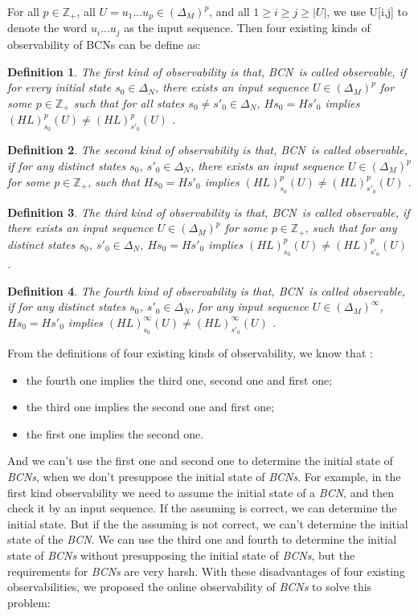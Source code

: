 \documentclass[conference]{IEEEtran} %
\newtheorem{definition}{Definition}
\def \BCN {{\em BCN}}
\begin{document}
For all  $p\in \mathbb{Z}_+$, all $U=u_1 ... u_p \in(\Delta_M)^p$, and all $1\ge i \ge j \ge |U|$, we use U[i,j] to denote the word $u_i ... u_j$ as the input sequence. Then four existing kinds of observability of BCNs can be define as: 
\begin{definition}
The first kind of observability is that, \BCN\ is called observable, if for every initial state $s_0 \in \Delta_N$, there exists an input sequence $U\in(\Delta_M)^p$ for some $p\in \mathbb{Z}_+$ such that for all states $s_0\neq {s'}_0\in \Delta_N$, $Hs_0=H{s'}_0$ implies $(HL)^p_{s_0}(U)\neq (HL)^p_{{s'}_0}(U)$ \cite{cheng2009controllability}.
\end{definition}
\begin{definition}
	The second kind of observability is that, \BCN\ is called observable, if for any distinct states $s_0$, ${s'}_0 \in \Delta_N$, there exists an input sequence $U\in(\Delta_M)^p$ for some $p\in \mathbb{Z}_+$, such that $Hs_0=H{s'}_0$ implies $(HL)^p_{s_0}(U)\neq (HL)^p_{{s'}_0}(U)$ \cite{Zhao2010Input}.
\end{definition}
\begin{definition}
	The third kind of observability is that, \BCN\ is called observable, if there exists an input sequence $U\in(\Delta_M)^p$ for some $p\in \mathbb{Z}_+$, such that for any distinct states $s_0$, ${s'}_0 \in \Delta_N$, $Hs_0=H{s'}_0$ implies $(HL)^p_{s_0}(U)\neq (HL)^p_{{s'}_0}(U)$ \cite{Cheng2011Identification}.
\end{definition}
\begin{definition}
	The fourth kind of observability is that, \BCN\ is called observable, if for any distinct states $s_0$, ${s'}_0 \in \Delta_N$, for any input sequence $U\in(\Delta_M)^{\infty}$, $Hs_0=H{s'}_0$ implies $(HL)^{\infty}_{s_0}(U)\neq (HL)^{\infty}_{{s'}_0}(U)$ \cite{Fornasini2013Observability}.
\end{definition}

From the definitions of  four existing kinds of observability, we know that \cite{Zhang2016Observability}:
\begin{itemize}
  \item the fourth one implies the third one, second one and first one;
  \item the third one implies the second one and first one;
  \item the first one implies the second one.
\end{itemize} 

 And we can't use the first one and second one to determine the initial state of {\em BCNs}, when we don't presuppose the initial state of {\em BCNs}. For example, in the first kind observability we need to assume the initial state of a {\em BCN}, and then check it by an input sequence. If the assuming is correct, we can determine the initial state. But if the the assuming is not correct, we can't determine the initial state of the {\em BCN}. We can use the third one and fourth to determine the initial state of {\em BCNs} without presupposing the initial state of {\em BCNs}, but the requirements for {\em BCNs} are very harsh. With these disadvantages of four existing observabilities, we proposed the online observability of {\em BCNs} to solve this problem:
\end{document}

